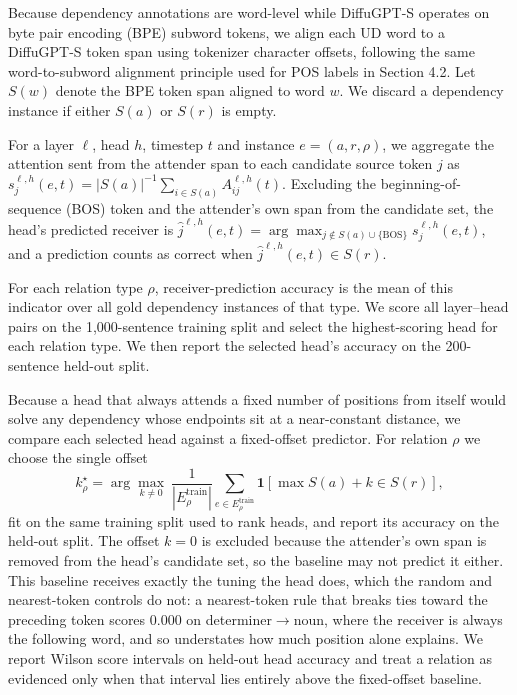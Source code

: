 \documentclass{article} %
\begin{document}
Because dependency annotations are word-level while DiffuGPT-S operates on byte pair encoding (BPE) subword tokens, we align each UD word to a DiffuGPT-S token span using tokenizer character offsets, following the same word-to-subword alignment principle used for POS labels in Section 4.2. Let $S(w)$ denote the BPE token span aligned to word $w$. We discard a dependency instance if either $S(a)$ or $S(r)$ is empty.

For a layer $\ell$, head $h$, timestep $t$ and instance $e=(a,r,\rho)$, we aggregate the attention sent from the attender span to each candidate source token $j$ as $s^{\ell,h}_{j}(e,t)=\lvert S(a)\rvert^{-1}\sum_{i\in S(a)} A^{\ell,h}_{ij}(t)$. Excluding the beginning-of-sequence (BOS) token and the attender's own span from the candidate set, the head's predicted receiver is $\hat{j}^{\ell,h}(e,t)=\arg\max_{j \notin S(a)\cup\{\mathrm{BOS}\}} s^{\ell,h}_{j}(e,t)$, and a prediction counts as correct when $\hat{j}^{\ell,h}(e,t)\in S(r)$.

For each relation type $\rho$, receiver-prediction accuracy is the mean of this indicator over all gold dependency instances of that type. We score all layer--head pairs on the 1,000-sentence training split and select the highest-scoring head for each relation type. We then report the selected head's accuracy on the 200-sentence held-out split. 

Because a head that always attends a fixed number of positions from itself would solve any dependency whose endpoints sit at a near-constant distance, we compare each selected head against a fixed-offset predictor. For relation $\rho$ we choose the single offset
\begin{equation}
k^\star_\rho=\arg\max_{k\neq 0}\ \frac{1}{|E^{\mathrm{train}}_\rho|}\sum_{e\in E^{\mathrm{train}}_\rho}\mathbf{1}\!\left[\max S(a)+k \in S(r)\right],
\end{equation}
fit on the same training split used to rank heads, and report its accuracy on the held-out split. The offset $k=0$ is excluded because the attender's own span is removed from the head's candidate set, so the baseline may not predict it either. This baseline receives exactly the tuning the head does, which the random and nearest-token controls do not: a nearest-token rule that breaks ties toward the preceding token scores $0.000$ on determiner$\to$noun, where the receiver is always the following word, and so understates how much position alone explains. We report Wilson score intervals on held-out head accuracy and treat a relation as evidenced only when that interval lies entirely above the fixed-offset baseline.
\end{document}
